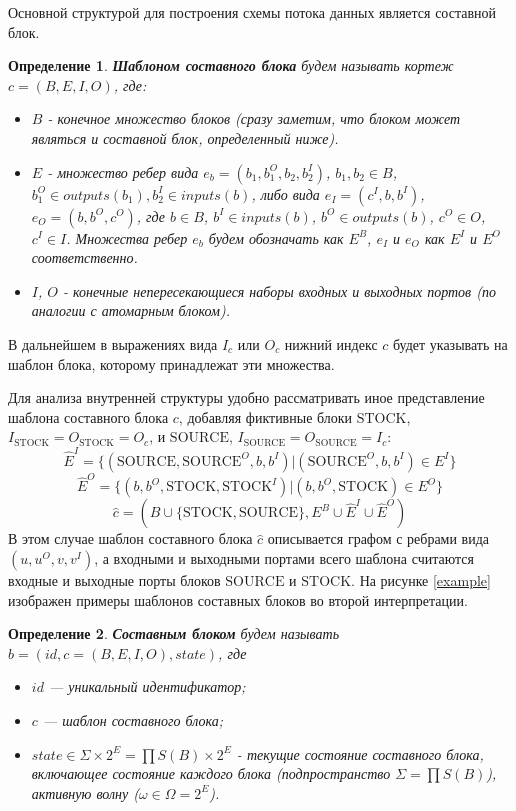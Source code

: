 \documentclass[10pt,a4paper]{article}
\newtheorem{defen}{Определение}
\newcommand{\stock}{\text{STOCK}}
\newcommand{\source}{\text{SOURCE}}
\begin{document}
Основной структурой для построения схемы потока данных является составной блок.

\begin{defen}
 \textbf{Шаблоном составного блока} будем называть кортеж $c = (B, E, I, O)$, где:
 \begin{itemize}
    \item $B$ - конечное множество блоков (сразу заметим, что блоком может являться и составной блок, определенный ниже).
    \item $E$ - множество ребер вида $e_b = (b_1, b^O_{1}, b_2, b^I_{2})$, $b_1, b_2 \in B$, $b^O_{1} \in outputs(b_1), b^I_{2} \in inputs(b)$,
                либо вида $e_I = (c^I, b, b^I)$, $e_O = (b, b^O, c^O)$, где $b \in B$, $b^I \in inputs(b)$, $b^O \in outputs(b)$, $c^O \in O$, $c^I \in I$.
                Множества ребер $e_b$ будем обозначать как $E^B$, $e_I$ и $e_O$ как $E^I$ и $E^O$ соответственно.
    \item $I$, $O$ - конечные непересекающиеся наборы входных и выходных портов (по аналогии с атомарным блоком).
  \end{itemize}
\end{defen}

В дальнейшем в выражениях вида $I_c$ или $O_c$ нижний индекс $c$ будет указывать на шаблон блока, которому принадлежат эти множества.

Для анализа внутренней структуры удобно рассматривать иное представление шаблона составного блока $c$, добавляя фиктивные блоки $\stock$, $I_{\stock} = O_{\stock} = O_c$,
  и $\source$, $I_{\source} = O_{\source} = I_c$:
$$\hat{E}^I = \{(\source, \source^O, b, b^I) \vert (\source^O, b, b^I) \in E^I\}$$
$$\hat{E}^O = \{ (b, b^O, \stock, \stock^I) \vert (b, b^O, \stock) \in E^O \}$$
$$\hat{c} = (B \cup \{\stock, \source\}, E^B \cup \hat{E}^I \cup \hat{E}^O)$$
В этом случае шаблон составного блока $\hat{c}$ описывается графом с ребрами вида $(u, u^O, v, v^I)$,
а входными и выходными портами всего шаблона считаются входные и выходные порты блоков $\source$ и $\stock$.
На рисунке \ref{example} изображен примеры шаблонов составных блоков во второй интерпретации.

\begin{defen}
  \textbf{Составным блоком} будем называть $b = (id, c = (B, E, I, O), state)$, где
  \begin{itemize}
    \item $id$ --- уникальный идентификатор;
    \item $c$ --- шаблон составного блока;
    \item $state \in \Sigma \times 2^E = \prod S(B) \times 2^E$ - текущие состояние составного блока, включающее
          состояние каждого блока (подпространство $\Sigma = \prod S(B)$), активную волну ($\omega \in \Omega = 2^E$).
  \end{itemize}
\end{defen}
\end{document}
